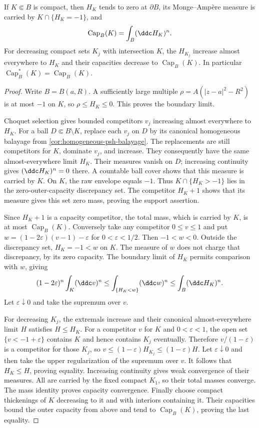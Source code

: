 \begin{proposition}\label{prop:relative-extremal-compact}
If $K\Subset B$ is compact, then $H_K$ tends to zero at $\partial B$, its Monge--Amp\`ere measure is carried by $K\cap\{H_K=-1\}$, and
\[
 \operatorname{Cap}_B(K)=\int_B(\ddc H_K)^n.
\]
For decreasing compact sets $K_j$ with intersection $K$, the $H_{K_j}$ increase almost everywhere to $H_K$ and their capacities decrease to $\operatorname{Cap}_B(K)$. In particular $\operatorname{Cap}_B^*(K)=\operatorname{Cap}_B(K)$.
\end{proposition}
\begin{proof}
Write $B=B(a,R)$. A sufficiently large multiple $\rho=A(|z-a|^2-R^2)$ is at most $-1$ on $K$, so $\rho\le H_K\le0$. This proves the boundary limit.

Choquet selection gives bounded competitors $v_j$ increasing almost everywhere to $H_K$. For a ball $D\Subset B\setminus K$, replace each $v_j$ on $D$ by its canonical homogeneous balayage from \cref{cor:homogeneous-psh-balayage}. The replacements are still competitors for $K$, dominate $v_j$, and increase. They consequently have the same almost-everywhere limit $H_K$. Their measures vanish on $D$; increasing continuity gives $(\ddc H_K)^n=0$ there. A countable ball cover shows that this measure is carried by $K$. On $K$, the raw envelope equals $-1$. Thus $K\cap\{H_K>-1\}$ lies in the zero-outer-capacity discrepancy set. The competitor $H_K+1$ shows that its measure gives this set zero mass, proving the support assertion.

Since $H_K+1$ is a capacity competitor, the total mass, which is carried by $K$, is at most $\operatorname{Cap}_B(K)$. Conversely take any competitor $0\le v\le1$ and put $w=(1-2\varepsilon)(v-1)-\varepsilon$ for $0<\varepsilon<1/2$. Then $-1<w<0$. Outside the discrepancy set, $H_K=-1<w$ on $K$. The measure of $w$ does not charge that discrepancy, by its zero capacity. The boundary limit of $H_K$ permits comparison with $w$, giving
\[
 (1-2\varepsilon)^n\int_K(\ddc v)^n
 \le\int_{\{H_K<w\}}(\ddc w)^n
 \le\int_B(\ddc H_K)^n.
\]
Let $\varepsilon\downarrow0$ and take the supremum over $v$.

For decreasing $K_j$, the extremals increase and their canonical almost-everywhere limit $H$ satisfies $H\le H_K$. For a competitor $v$ for $K$ and $0<\varepsilon<1$, the open set $\{v<-1+\varepsilon\}$ contains $K$ and hence contains $K_j$ eventually. Therefore $v/(1-\varepsilon)$ is a competitor for those $K_j$, so $v\le(1-\varepsilon)H_{K_j}\le(1-\varepsilon)H$. Let $\varepsilon\downarrow0$ and then take the upper regularization of the supremum over $v$. It follows that $H_K\le H$, proving equality. Increasing continuity gives weak convergence of their measures. All are carried by the fixed compact $K_1$, so their total masses converge. The mass identity proves capacity convergence. Finally choose compact thickenings of $K$ decreasing to it and with interiors containing it. Their capacities bound the outer capacity from above and tend to $\operatorname{Cap}_B(K)$, proving the last equality.
\end{proof}

